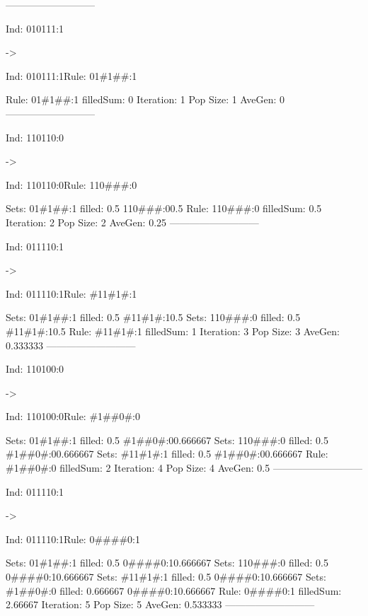 \documentclass[12pt,openright,twoside,letterpaper,english,brazil,sumario=tradicional]{abntex2}
\begin{document}
---------------------------

\begin{flushleft}\ttfamily
\par Ind: 010111:1\end{flushleft} -> \begin{flushleft}\ttfamily
\par Ind: 010111:1Rule: 01\#1\#\#:1
\end{flushleft}Rule:	01\#1\#\#:1
filledSum: 0
Iteration: 1 Pop Size: 1 AveGen: 0
---------------------------

\begin{flushleft}\ttfamily
\par Ind: 110110:0\end{flushleft} -> \begin{flushleft}\ttfamily
\par Ind: 110110:0Rule: 110\#\#\#:0
\end{flushleft}  Sets:	01\#1\#\#:1 filled: 0.5 110\#\#\#:0{0.5}
Rule:	110\#\#\#:0
filledSum: 0.5
Iteration: 2 Pop Size: 2 AveGen: 0.25
---------------------------

\begin{flushleft}\ttfamily
\par Ind: 011110:1\end{flushleft} -> \begin{flushleft}\ttfamily
\par Ind: 011110:1Rule: \#11\#1\#:1
\end{flushleft}  Sets:	01\#1\#\#:1 filled: 0.5 \#11\#1\#:1{0.5}
  Sets:	110\#\#\#:0 filled: 0.5 \#11\#1\#:1{0.5}
Rule:	\#11\#1\#:1
filledSum: 1
Iteration: 3 Pop Size: 3 AveGen: 0.333333
---------------------------

\begin{flushleft}\ttfamily
\par Ind: 110100:0\end{flushleft} -> \begin{flushleft}\ttfamily
\par Ind: 110100:0Rule: \#1\#\#0\#:0
\end{flushleft}  Sets:	01\#1\#\#:1 filled: 0.5 \#1\#\#0\#:0{0.666667}
  Sets:	110\#\#\#:0 filled: 0.5 \#1\#\#0\#:0{0.666667}
  Sets:	\#11\#1\#:1 filled: 0.5 \#1\#\#0\#:0{0.666667}
Rule:	\#1\#\#0\#:0
filledSum: 2
Iteration: 4 Pop Size: 4 AveGen: 0.5
---------------------------

\begin{flushleft}\ttfamily
\par Ind: 011110:1\end{flushleft} -> \begin{flushleft}\ttfamily
\par Ind: 011110:1Rule: 0\#\#\#\#0:1
\end{flushleft}  Sets:	01\#1\#\#:1 filled: 0.5 0\#\#\#\#0:1{0.666667}
  Sets:	110\#\#\#:0 filled: 0.5 0\#\#\#\#0:1{0.666667}
  Sets:	\#11\#1\#:1 filled: 0.5 0\#\#\#\#0:1{0.666667}
  Sets:	\#1\#\#0\#:0 filled: 0.666667 0\#\#\#\#0:1{0.666667}
Rule:	0\#\#\#\#0:1
filledSum: 2.66667
Iteration: 5 Pop Size: 5 AveGen: 0.533333
---------------------------
\end{document}
